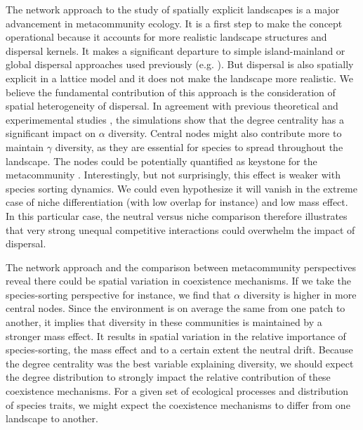 \documentclass[12pt]{article}
\begin{document}
The network approach to the study of spatially explicit landscapes is a major
advancement in metacommunity ecology. It is a first step to make the concept
operational because it accounts for more realistic landscape structures and
dispersal kernels. It makes a significant departure to simple island-mainland or
global dispersal approaches used previously (e.g. \parencite{Tilman1994, Hubbell2001,
Mouquet2002}). But dispersal is also spatially explicit in a
lattice model and it does not make the landscape more realistic. We believe the
fundamental contribution of this approach is the consideration of spatial
heterogeneity of dispersal. In agreement with previous theoretical
\parencite{Economo2011, Desjardins2012} and experimemental studies
\parencite{Altermat2012}, the simulations show that the degree centrality has a
significant impact on $\alpha$ diversity. Central nodes might also
contribute more to maintain $\gamma$ diversity, as they are essential for
species to spread throughout the landscape. The nodes could be potentially
quantified as keystone for the metacommunity \parencite{Mouquet2013}.
Interestingly, but not surprisingly, this effect is weaker with species sorting
dynamics. We could even hypothesize it will vanish in the extreme case of niche
differentiation (with low overlap for instance) and low mass effect. In this particular case, the neutral
versus niche comparison therefore illustrates that very strong unequal
competitive interactions could overwhelm the impact of dispersal.

The network approach and the comparison between metacommunity perspectives
reveal there could be spatial variation in coexistence mechanisms. If we take
the species-sorting perspective for instance, we find that $\alpha$ diversity is
higher in more central nodes. Since the environment is on average the same from
one patch to another, it implies that diversity in these communities is
maintained by a stronger mass effect. It results in spatial variation in the
relative importance of species-sorting, the mass effect and to a certain extent
the neutral drift. Because the degree centrality was the best variable
explaining diversity, we should expect the degree distribution to strongly
impact the relative contribution of these coexistence mechanisms. For a given
set of ecological processes and distribution of species traits, we might expect
the coexistence mechanisms to differ from one landscape to another.
\end{document}
